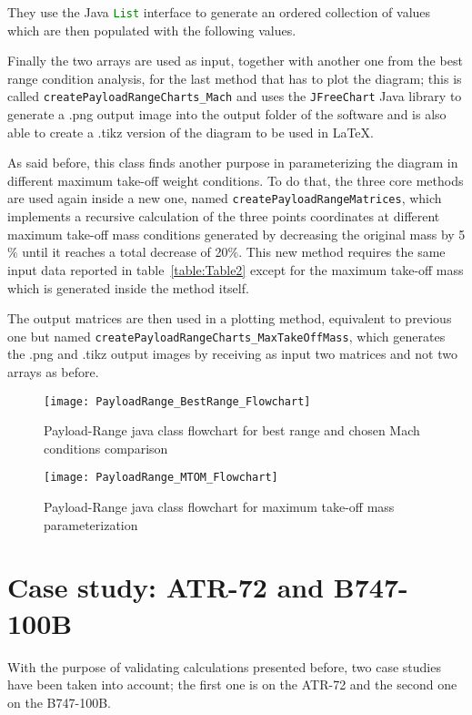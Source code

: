 \noindent
They use the Java \lstinline[language=Java]!List! interface to generate an ordered collection of values which are then populated with the following values.

\bigskip
\noindent
Finally the two arrays are used as input, together with another one from the best range condition analysis, for the last method that has to plot the diagram; this is called \lstinline[language=Java]!createPayloadRangeCharts_Mach! and uses the \lstinline[language=Java]!JFreeChart! Java library to generate a .png output image into the output folder of the software and is also able to create a .tikz version of the diagram to be used in \LaTeX.

As said before, this class finds another purpose in parameterizing the diagram in different maximum take-off weight conditions. To do that, the three core methods are used again inside a new one, named \lstinline[language=Java]!createPayloadRangeMatrices!, which implements a recursive calculation of the three points coordinates at different maximum take-off mass conditions generated by decreasing the original mass by 5$\%$ until it reaches a total decrease of 20$\%$. This new method requires the same input data reported in table~\ref{table:Table2} except for the maximum take-off mass which is generated inside the method itself.

The output matrices are then used in a plotting method, equivalent to previous one but named \lstinline[language=Java]!createPayloadRangeCharts_MaxTakeOffMass!, which generates the .png and .tikz output images by receiving as input two matrices and not two arrays as before.

\bigskip
\begin{figure}[!ht]
\centering
\texttt{[image: PayloadRange\_BestRange\_Flowchart]}
\caption{Payload-Range java class flowchart for best range and chosen Mach conditions comparison}
\label{fig:Figure3}
\end{figure}

\bigskip
\begin{figure}[!ht]
\centering
\texttt{[image: PayloadRange\_MTOM\_Flowchart]}
\caption{Payload-Range java class flowchart for maximum take-off mass parameterization}
\label{fig:Figure4}
\end{figure}


\section{Case study: ATR-72 and B747-100B}
With the purpose of validating calculations presented before, two case studies have been taken into account; the first one is on the ATR-72 and the second one on the B747-100B.

